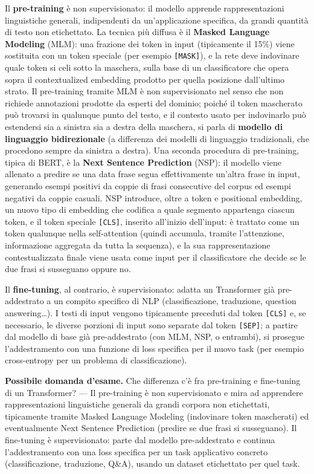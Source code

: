 \documentclass[11pt,a4paper]{report}
\newcommand{\domandaesame}[1]{\begin{esame}\textbf{Possibile domanda d'esame.} #1\end{esame}}
\begin{document}
Il \textbf{pre-training} è non supervisionato: il modello apprende rappresentazioni linguistiche generali, indipendenti da un'applicazione specifica, da grandi quantità di testo non etichettato. La tecnica più diffusa è il \textbf{Masked Language Modeling} (MLM): una frazione dei token in input (tipicamente il 15\%) viene sostituita con un token speciale (per esempio \texttt{[MASK]}), e la rete deve indovinare quale token si celi sotto la maschera, sulla base di un classificatore che opera sopra il contextualized embedding prodotto per quella posizione dall'ultimo strato. Il pre-training tramite MLM è non supervisionato nel senso che non richiede annotazioni prodotte da esperti del dominio; poiché il token mascherato può trovarsi in qualunque punto del testo, e il contesto usato per indovinarlo può estendersi sia a sinistra sia a destra della maschera, si parla di \textbf{modello di linguaggio bidirezionale} (a differenza dei modelli di linguaggio tradizionali, che procedono sempre da sinistra a destra). Una seconda procedura di pre-training, tipica di BERT, è la \textbf{Next Sentence Prediction} (NSP): il modello viene allenato a predire se una data frase segua effettivamente un'altra frase in input, generando esempi positivi da coppie di frasi consecutive del corpus ed esempi negativi da coppie casuali. NSP introduce, oltre a token e positional embedding, un nuovo tipo di embedding che codifica a quale segmento appartenga ciascun token, e il token speciale \texttt{[CLS]}, inserito all'inizio dell'input: è trattato come un token qualunque nella self-attention (quindi accumula, tramite l'attenzione, informazione aggregata da tutta la sequenza), e la sua rappresentazione contestualizzata finale viene usata come input per il classificatore che decide se le due frasi si susseguano oppure no.

Il \textbf{fine-tuning}, al contrario, è supervisionato: adatta un Transformer già pre-addestrato a un compito specifico di NLP (classificazione, traduzione, question answering\ldots). I testi di input vengono tipicamente preceduti dal token \texttt{[CLS]} e, se necessario, le diverse porzioni di input sono separate dal token \texttt{[SEP]}; a partire dal modello di base già pre-addestrato (con MLM, NSP, o entrambi), si prosegue l'addestramento con una funzione di loss specifica per il nuovo task (per esempio cross-entropy per un problema di classificazione).

\domandaesame{Che differenza c'è fra pre-training e fine-tuning di un Transformer? --- Il pre-training è non supervisionato e mira ad apprendere rappresentazioni linguistiche generali da grandi corpora non etichettati, tipicamente tramite Masked Language Modeling (indovinare token mascherati) ed eventualmente Next Sentence Prediction (predire se due frasi si susseguano). Il fine-tuning è supervisionato: parte dal modello pre-addestrato e continua l'addestramento con una loss specifica per un task applicativo concreto (classificazione, traduzione, Q\&A), usando un dataset etichettato per quel task.}
\end{document}
